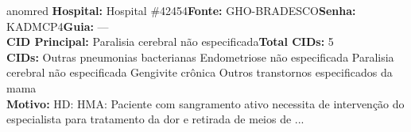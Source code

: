 \documentclass[a4paper,10pt]{article}
\begin{document}
\begin{anomalycard}[Interna\c{c}\~{a}o \#119999 | Pac. \#40548 | CR\'{I}TICO (z=6.65) | LOS: 5d | 04/03/2026\,$\to$\,09/03/2026]{anomred}
\textbf{Hospital:} Hospital \#42454\quad \textbf{Fonte:} GHO-BRADESCO\quad \textbf{Senha:} KADMCP4\quad \textbf{Guia:} ---\\

\textbf{CID Principal:} {\small Paralisia cerebral não especificada}\quad\textbf{Total CIDs:} 5\\

\textbf{CIDs:} {\scriptsize Outras pneumonias bacterianas \textbar{} Endometriose não especificada \textbar{} Paralisia cerebral não especificada \textbar{} Gengivite crônica \textbar{} Outros transtornos especificados da mama}\\

\textbf{Motivo:} {\scriptsize HD:  HMA: Paciente com sangramento ativo necessita de intervenção do especialista para tratamento da dor e retirada de meios de ...}\\




\end{anomalycard}
\end{document}
